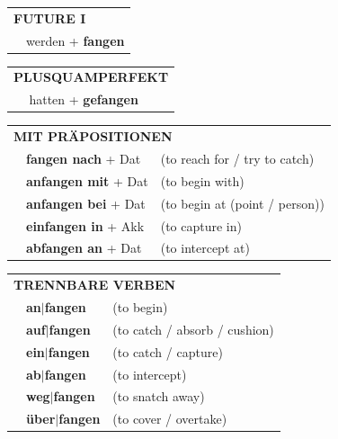 \documentclass[10pt,a4paper]{revtex4-2}
\begin{document}
\begin{verbbox-acc}
\begin{tabular}{rl}
    \multicolumn{2}{l}{\textbf{FUTURE I} }\\
  &  werden + \textbf{fangen}\\
 
  \end{tabular}
\hfill
   \begin{tabular}{rl}
      \multicolumn{2}{l}{\textbf{PLUSQUAMPERFEKT}}\\
  &  hatten + \textbf{gefangen}\\
  \end{tabular}
  
  \vspace{10pt}

   \begin{tabular}{lll}
      \multicolumn{3}{l}{\textbf{MIT PRÄPOSITIONEN}}\\
      & \textbf{fangen nach} + Dat & (to reach for / try to catch)\\
&\textbf{anfangen mit} + Dat & (to begin with)\\
&\textbf{anfangen bei} + Dat & (to begin at (point / person))\\
& \textbf{einfangen in} + Akk & (to capture in)\\
& \textbf{abfangen an} + Dat & (to intercept at)
  \end{tabular}
  \hfill
   \begin{tabular}{lll}
      \multicolumn{3}{l}{\textbf{TRENNBARE VERBEN}}\\
 & \textbf{an$|$fangen} & (to begin)\\
 & \textbf{auf$|$fangen} & (to catch / absorb / cushion)\\
 & \textbf{ein$|$fangen} & (to catch / capture)\\
  & \textbf{ab$|$fangen} & (to intercept)\\
  & \textbf{weg$|$fangen} & (to snatch away)\\
  & \textbf{über$|$fangen} & (to cover / overtake)
  \end{tabular}


  \vspace{-5pt}

\end{verbbox-acc}
\end{document}

